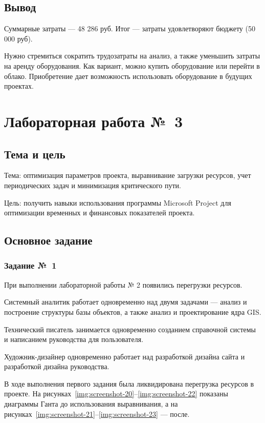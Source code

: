 \documentclass{bmstu}
\begin{document}
\section{Вывод}

Суммарные затраты --- 48 286 руб. 
Итог --- затраты удовлетворяют бюджету (50 000 руб).

Нужно стремиться сократить трудозатраты на анализ, а также уменьшить затраты на аренду оборудования. 
Как вариант, можно купить оборудование или перейти в облако. 
Приобретение дает возможность использовать оборудование в будущих проектах.

\chapter{Лабораторная работа №~3}

\section{Тема и цель}

Тема: оптимизация параметров проекта, выравнивание загрузки ресурсов, учет периодических задач и минимизация критического пути.

Цель: получить навыки использования программы Microsoft Project для оптимизации временных и финансовых показателей проекта.

\section{Основное задание}

\subsection{Задание №~1}

При выполнении лабораторной работы № 2 появились перегрузки ресурсов.

Системный аналитик работает одновременно над двумя задачами --- анализ и построение структуры базы объектов, а также анализ и проектирование ядра GIS.

Технический писатель занимается одновременно созданием справочной системы и написанием руководства для пользователя.

Художник-дизайнер одновременно работает над разработкой дизайна сайта и разработкой дизайна руководства.

В ходе выполнения первого задания была ликвидирована перегрузка ресурсов в проекте. 
На рисунках~\ref{img:screenshot-20}--\ref{img:screenshot-22} показаны диаграммы Ганта до использования выравнивания, а на рисунках~\ref{img:screenshot-21}--\ref{img:screenshot-23} --- после.
    
\end{document}
